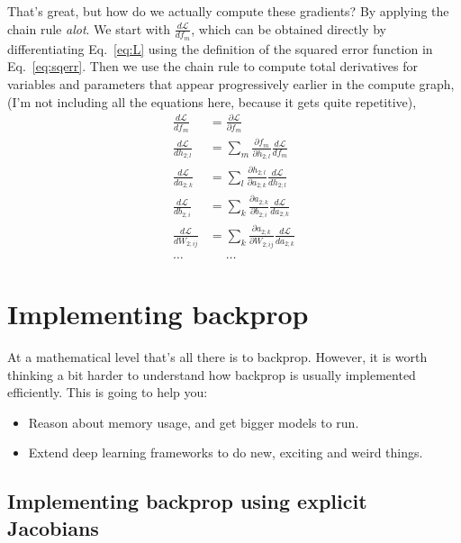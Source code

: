 \documentclass{article}
\newcommand{\dd}[2][]{\frac{\partial #1}{\partial #2}}
\newcommand{\dt}[2][]{\frac{d #1}{d #2}}
\newcommand{\dL}{\dt[\L]}
\renewcommand{\L}{\mathcal{L}}
\begin{document}
That's great, but how do we actually compute these gradients?
By applying the chain rule \textit{alot}.
We start with $\dL{f_m}$, which can be obtained directly by differentiating Eq.~\eqref{eq:L} using the definition of the squared error function in Eq.~\eqref{eq:sqerr}.
Then we use the chain rule to compute total derivatives for variables and parameters that appear progressively earlier in the compute graph, (I'm not including all the equations here, because it gets quite repetitive),
\begin{subequations}
\label{eq:back_chain}
\begin{align}
  \dL{f_m} &= \dd[\L]{f_m}\\
  \label{eq:back_chain:1}
  \dL{h_{2; l}} &= \sum_m \dd[f_m]{h_{2;l}} \dL{f_m}\\
  \label{eq:back_chain:2}
  \dL{a_{2; k}} &= \sum_l \dd[h_{2;l}]{a_{2;k}} \dL{h_{2; l}}\\
  \dL{b_{2;i}} &= \sum_{k} \dd[a_{2; k}]{b_{2; i}} \dL{a_{2; k}} \\
  \label{eq:back_chain:4}
  \dL{W_{2;ij}} &= \sum_{k} \dd[a_{2; k}]{W_{2; ij}} \dL{a_{2; k}}\\
  \dots &\phantom{=} \dots
\end{align}
\end{subequations}

\section{Implementing backprop}

At a mathematical level that's all there is to backprop.
However, it is worth thinking a bit harder to understand how backprop is usually implemented efficiently.
This is going to help you: 
\begin{itemize}
  \item Reason about memory usage, and get bigger models to run.
  \item Extend deep learning frameworks to do new, exciting and weird things.
\end{itemize}

\subsection{Implementing backprop using explicit Jacobians}
\end{document}
